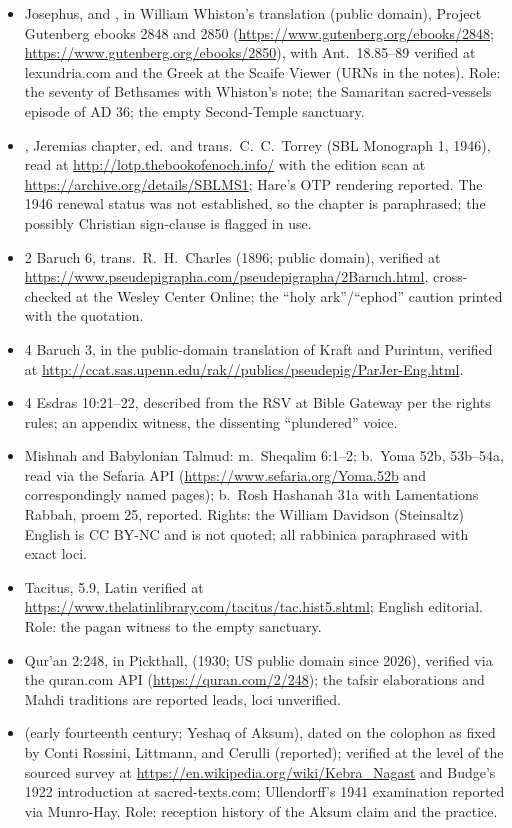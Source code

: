 \begin{itemize}
\item Josephus,  and , in William
Whiston's translation (public domain), Project Gutenberg ebooks 2848
and 2850 (\url{https://www.gutenberg.org/ebooks/2848};
\url{https://www.gutenberg.org/ebooks/2850}), with Ant.\ 18.85--89
verified at lexundria.com and
the Greek at the Scaife Viewer (URNs in the notes). Role: the seventy
of Bethsames with Whiston's note; the Samaritan sacred-vessels episode
of AD 36; the empty Second-Temple sanctuary.
\item {}, Jeremias chapter, ed.\ and trans.\
C.~C.~Torrey (SBL Monograph 1, 1946), read at
\url{http://lotp.thebookofenoch.info/} with the edition scan at
\url{https://archive.org/details/SBLMS1}; Hare's OTP rendering
reported. The 1946 renewal status was not established, so the chapter
is paraphrased; the possibly Christian sign-clause is flagged in use.
\item 2 Baruch 6, trans.\ R.~H.~Charles (1896; public domain),
verified at
\url{https://www.pseudepigrapha.com/pseudepigrapha/2Baruch.html},
cross-checked at the Wesley Center Online; the ``holy ark''/``ephod''
caution printed with the quotation.
\item 4 Baruch 3, in the public-domain translation of Kraft and
Purintun, verified at
\url{http://ccat.sas.upenn.edu/rak//publics/pseudepig/ParJer-Eng.html}.
\item 4 Esdras 10:21--22, described from the RSV at Bible Gateway per
the rights rules; an appendix witness, the dissenting ``plundered''
voice.
\item Mishnah and Babylonian Talmud: m.\ Sheqalim 6:1--2; b.\ Yoma 52b,
53b--54a, read via the Sefaria API
(\url{https://www.sefaria.org/Yoma.52b} and correspondingly named
pages); b.\ Rosh Hashanah 31a with Lamentations Rabbah, proem 25,
reported. Rights: the William Davidson (Steinsaltz) English is CC
BY-NC and is not quoted; all rabbinica paraphrased with exact loci.
\item Tacitus, \work{Historiae} 5.9, Latin verified at
\url{https://www.thelatinlibrary.com/tacitus/tac.hist5.shtml}; English
editorial. Role: the pagan witness to the empty sanctuary.
\item Qur'an 2:248, in Pickthall, \work{The Meaning of the Glorious
Koran} (1930; US public domain since 2026), verified via the quran.com
API (\url{https://quran.com/2/248}); the tafsir elaborations and Mahdi
traditions are reported leads, loci unverified.
\item {} (early fourteenth century; Yeshaq of Aksum),
dated on the colophon as fixed by Conti Rossini, Littmann, and Cerulli
(reported); verified at the level of the sourced survey at
\url{https://en.wikipedia.org/wiki/Kebra_Nagast} and Budge's 1922
introduction at sacred-texts.com; Ullendorff's 1941 examination
reported via Munro-Hay. Role: reception history of the Aksum claim and
the \term{tabot} practice.
\end{itemize}
